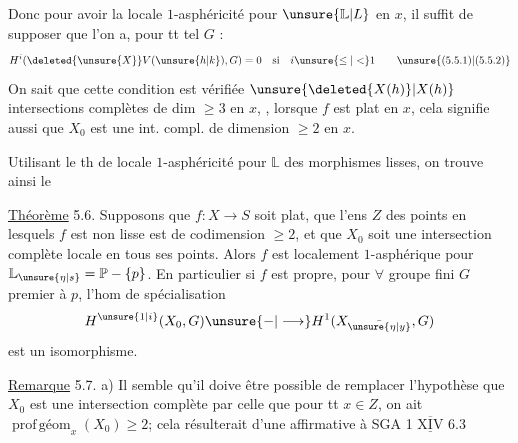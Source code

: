 
Donc pour avoir la locale $1$-asphéricité pour $\unsure{\mathbb{L}|L}$ en $x$, il suffit de supposer que l'on a, pour tt tel $G$ :
\[
H^i(\deleted{\unsure{X}}V(\unsure{h|k}),G)=0\quad\text{si}\quad i\unsure{\leq|<}1
\tag*{\unsure{(5.5.1)|(5.5.2)}}
\]
On sait  que cette condition est vérifiée   $\unsure{\deleted{X(h)}|X(h)}$   intersections complètes de dim $\geq3$ en $x$, , lorsque $f$ est plat en $x$, cela signifie aussi que $X_0$ est une int. compl. de dimension $\geq2$ en $x$.

Utilisant le th de locale $1$-asphéricité pour $\mathbb{L}$ des morphismes lisses, on trouve ainsi le

\uline{Théorème} 5.6. Supposons que $f:X\longrightarrow S$ soit plat, que l'ens $Z$ des points  en lesquels $f$ est non lisse est de codimension $\geq2$, et que $X_0$ soit une intersection complète locale en tous ses points. Alors $f$ est localement $1$-asphérique pour $\mathbb{L}_{\unsure{\eta|s}}=\mathbb{P}-\{p\}$. En particulier si $f$ est propre,  pour $\forall$ groupe fini $G$  premier à $p$, l'hom de spécialisation
\[
H^{\unsure{1|i}}(X_0,G)\unsure{-|\longrightarrow}H^1(X_{\bar{\unsure{\eta|y}}},G)
\]
est un isomorphisme.

\uline{Remarque} 5.7. a) Il semble qu'il doive être possible de remplacer l'hypothèse que $X_0$ est une intersection complète par celle que pour tt $x\in Z$, on ait $\operatorname{prof\,géom}_x(X_0)\geq2$; cela résulterait d'une  affirmative à SGA 1 $\overline{\underline{\mathrm{XIV}}}$ 6.3
